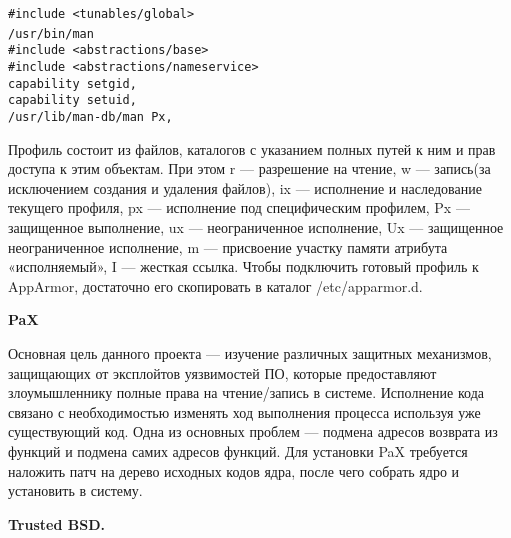 \bigskip
\begin{flushleft}
\texttt{\#include <tunables/global> \\  
/usr/bin/man { \\ 
	\#include <abstractions/base> \\
	\#include <abstractions/nameservice> \\
	capability setgid, \\
	capability setuid, \\
	/usr/lib/man-db/man Px,}\\ 
}
{\sloppy

}
\end{flushleft}

\bigskip
Профиль состоит из файлов, каталогов с указанием полных путей к ним и прав доступа к этим объектам. При этом r — разрешение на чтение, w — запись(за исключением создания и удаления файлов), ix — исполнение и наследование текущего профиля, px — исполнение под специфическим профилем, Px — защищенное выполнение, ux — неограниченное исполнение, Ux — защищенное неограниченное исполнение, m — присвоение участку памяти атрибута «исполняемый», I — жесткая ссылка. Чтобы подключить готовый профиль к          AppArmor, достаточно его скопировать в каталог /etc/apparmor.d. 

\bigskip
{\bfseries PaX }

Основная цель данного проекта — изучение различных защитных механизмов, защищающих от эксплойтов уязвимостей ПО, которые предоставляют злоумышленнику полные права на чтение/запись в системе. Исполнение кода связано с необходимостью изменять ход выполнения процесса используя уже существующий код. Одна из основных проблем — подмена адресов возврата из функций и подмена самих адресов функций. Для установки PaX требуется наложить патч на дерево исходных кодов ядра, после чего собрать ядро и установить в систему. 

\bigskip
{\bfseries Trusted BSD.}

